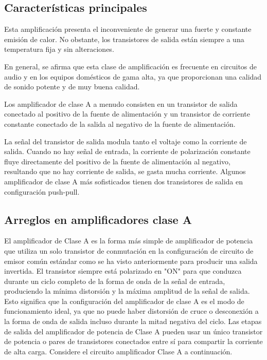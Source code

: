 \documentclass[12pt,a4paper]{article}
\begin{document}
\subsection{Características principales}
\begin{flushleft}
Esta amplificación presenta el inconveniente de generar una fuerte y constante emisión de calor. No obstante, los transistores de salida están siempre a una temperatura fija y sin alteraciones.\linebreak

En general, se afirma que esta clase de amplificación es frecuente en circuitos de audio y en los equipos domésticos de gama alta, ya que proporcionan una calidad de sonido potente y de muy buena calidad.\linebreak

Los amplificador de clase A a menudo consisten en un transistor de salida conectado al positivo de la fuente de alimentación y un transistor de corriente constante conectado de la salida al negativo de la fuente de alimentación.\linebreak

La señal del transistor de salida modula tanto el voltaje como la corriente de salida. Cuando no hay señal de entrada, la corriente de polarización constante fluye directamente del positivo de la fuente de alimentación al negativo, resultando que no hay corriente de salida, se gasta mucha corriente. Algunos amplificador de clase A más sofisticados tienen dos transistores de salida en configuración push-pull.\newpage
\end{flushleft}
\begin{center}
\section {Arreglos en amplificadores clase A}
\end{center}
El amplificador de Clase A es la forma más simple de amplificador de potencia que utiliza un solo transistor de conmutación en la configuración de circuito de emisor común estándar como se ha visto anteriormente para producir una salida invertida. El transistor siempre está polarizado en "ON" para que conduzca durante un ciclo completo de la forma de onda de la señal de entrada, produciendo la mínima distorsión y la máxima amplitud de la señal de salida.\linebreak
Esto significa que la configuración del amplificador de clase A es el modo de funcionamiento ideal, ya que no puede haber distorsión de cruce o desconexión a la forma de onda de salida incluso durante la mitad negativa del ciclo. Las etapas de salida del amplificador de potencia de Clase A pueden usar un único transistor de potencia o pares de transistores conectados entre sí para compartir la corriente de alta carga. Considere el circuito amplificador Clase A a continuación.\\
\end{document}
